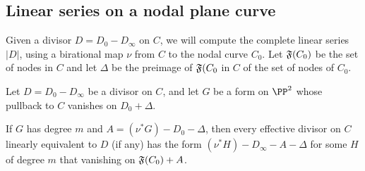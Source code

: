 \subsection{Linear series on a nodal plane curve}\label{linear series on nodal plane curves}

Given a divisor $D = D_{0}-D_{\infty}$ on $C$, we will compute the complete linear series $|D|$, using a birational map $\nu$ from 
$C$ to the nodal curve $C_0$. Let $\adj(C_{0})$ be the set of nodes in $C$ and let $\Delta$ be the preimage of $\adj(C_{0}$ in $C$ of the set of nodes of $C_{0}$.

\begin{theorem}\label{linear series on nodal curves}
Let $D = D_{0}-D_{\infty}$ be a divisor on $C$, and let $G$ be a form on $\PP^{2}$ whose pullback to $C$
vanishes on $D_{0}+\Delta$. 

If $G$ has degree $m$ and $A = (\nu^{*}G)-D_{0}-\Delta$, then every effective divisor on
$C$ linearly equivalent to $D$ (if any) has the form $(\nu^*H)-D_{\infty}-A-\Delta$ for some $H$ of degree $m$
that vanishing on $\adj(C_{0})+A$.
\end{theorem}

